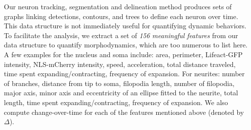 \vspace{-3mm} Our neuron tracking,  segmentation and delineation method produces  sets of
graphs linking  detections, contours, and trees to  define each neuron
over  time.  This  data   structure  is  not  immediately  useful  for
quantifying dynamic behaviors.  To facilitate the analysis, we extract
a  set of {\em  156 meaningful  features} from  our data  structure to
quantify morphodynamics, which  are too numerous to list  here.  A few
examples  for   the  nucleus   and  soma  include:   area,  perimeter,
Lifeact-GFP  intensity,  NLS-mCherry  intensity, speed,  acceleration,
total distance  traveled, time spent  expanding/contracting, frequency
of expansion.  For neurites: number  of branches, distance from tip to
soma, filopodia  length, number of  filopodia, major axis,  minor axis
and eccentricity of an ellipse fitted to the neurite, total length, time
spent expanding/contracting, frequency of expansion. We also compute
change-over-time for each of the features mentioned above 
(denoted by $\Delta$).

